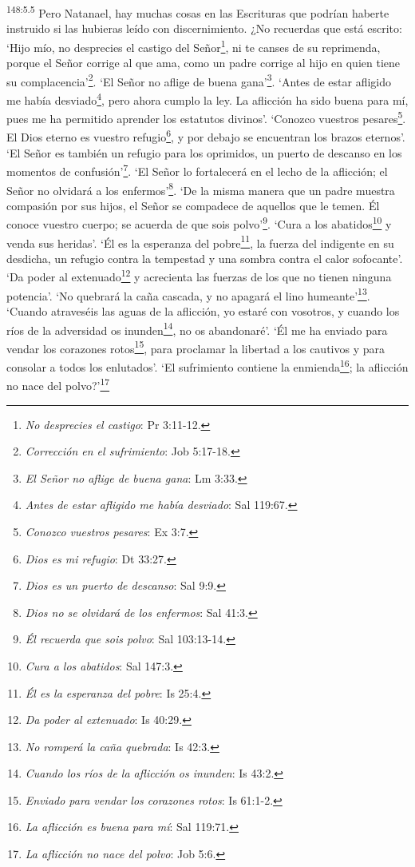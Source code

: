 \par 
\textsuperscript{148:5.5} \guillemotleft Pero Natanael, hay muchas cosas en las Escrituras que podrían haberte instruido si las hubieras leído con discernimiento. ¿No recuerdas que está escrito: `Hijo mío, no desprecies el castigo del Señor\footnote{\textit{No desprecies el castigo}: Pr 3:11-12.}, ni te canses de su reprimenda, porque el Señor corrige al que ama, como un padre corrige al hijo en quien tiene su complacencia'\footnote{\textit{Corrección en el sufrimiento}: Job 5:17-18.}. `El Señor no aflige de buena gana'\footnote{\textit{El Señor no aflige de buena gana}: Lm 3:33.}. `Antes de estar afligido me había desviado\footnote{\textit{Antes de estar afligido me había desviado}: Sal 119:67.}, pero ahora cumplo la ley. La aflicción ha sido buena para mí, pues me ha permitido aprender los estatutos divinos'. `Conozco vuestros pesares\footnote{\textit{Conozco vuestros pesares}: Ex 3:7.}. El Dios eterno es vuestro refugio\footnote{\textit{Dios es mi refugio}: Dt 33:27.}, y por debajo se encuentran los brazos eternos'. `El Señor es también un refugio para los oprimidos, un puerto de descanso en los momentos de confusión'\footnote{\textit{Dios es un puerto de descanso}: Sal 9:9.}. `El Señor lo fortalecerá en el lecho de la aflicción; el Señor no olvidará a los enfermos'\footnote{\textit{Dios no se olvidará de los enfermos}: Sal 41:3.}. `De la misma manera que un padre muestra compasión por sus hijos, el Señor se compadece de aquellos que le temen. Él conoce vuestro cuerpo; se acuerda de que sois polvo'\footnote{\textit{Él recuerda que sois polvo}: Sal 103:13-14.}. `Cura a los abatidos\footnote{\textit{Cura a los abatidos}: Sal 147:3.} y venda sus heridas'. `Él es la esperanza del pobre\footnote{\textit{Él es la esperanza del pobre}: Is 25:4.}, la fuerza del indigente en su desdicha, un refugio contra la tempestad y una sombra contra el calor sofocante'. `Da poder al extenuado\footnote{\textit{Da poder al extenuado}: Is 40:29.} y acrecienta las fuerzas de los que no tienen ninguna potencia'. `No quebrará la caña cascada, y no apagará el lino humeante'\footnote{\textit{No romperá la caña quebrada}: Is 42:3.}. `Cuando atraveséis las aguas de la aflicción, yo estaré con vosotros, y cuando los ríos de la adversidad os inunden\footnote{\textit{Cuando los ríos de la aflicción os inunden}: Is 43:2.}, no os abandonaré'. `Él me ha enviado para vendar los corazones rotos\footnote{\textit{Enviado para vendar los corazones rotos}: Is 61:1-2.}, para proclamar la libertad a los cautivos y para consolar a todos los enlutados'. `El sufrimiento contiene la enmienda\footnote{\textit{La aflicción es buena para mí}: Sal 119:71.}; la aflicción no nace del polvo?'\footnote{\textit{La aflicción no nace del polvo}: Job 5:6.}\guillemotright

